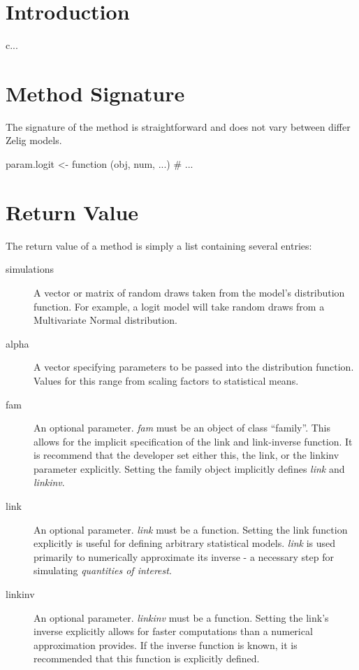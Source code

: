 \documentclass{article}
\begin{document}
\section{Introduction}
\label{section:boot-intro}

c...

\section{ Method Signature}

The signature of the  method is straightforward and does not vary
between differ Zelig models.

\begin{Code}
param.logit <- function (obj, num, ...) {
  # ...
}
\end{Code}

\section{ Return Value}

The return value of a  method is simply a list containing several entries:

\begin{description}
	\item[simulations] A vector or matrix of random draws taken from
		the model's distribution function.  For example, a logit model
		will take random draws from a Multivariate Normal distribution.
		
	\item[alpha] A vector specifying parameters to be passed into
		the distribution function.  Values for this range from scaling
		factors to statistical means.
	
	\item[fam] An optional parameter.  \emph{fam} must be an object
		of class ``family''.  This allows for the implicit specification
		of the link and link-inverse function.  It is recommend that the
		developer set either this, the link, or the linkinv parameter
		explicitly.  Setting the family object implicitly defines
		\emph{link} and \emph{linkinv}.
		
	\item[link] An optional parameter.  \emph{link} must be a function.
		Setting the link function explicitly is useful for defining
		arbitrary statistical models.  \emph{link} is used primarily to
		numerically approximate its inverse - a necessary step for
		simulating \emph{quantities of interest}.
		
	\item[linkinv] An optional parameter.  \emph{linkinv} must be a
		function.  Setting the link's inverse explicitly allows for faster
		computations than a numerical approximation provides.  If the
		inverse function is known, it is recommended that this function
		is explicitly defined.
		
\end{description}
\end{document}
